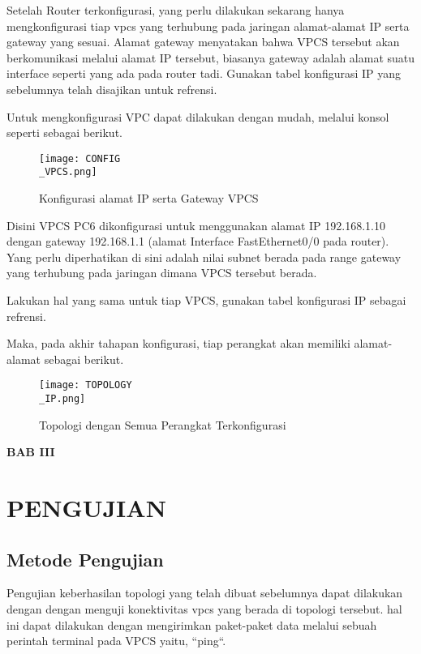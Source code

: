 \documentclass[12pt, a4paper]{article}
\begin{document}
  Setelah Router terkonfigurasi, yang perlu dilakukan sekarang hanya 
  mengkonfigurasi tiap vpcs yang terhubung pada jaringan alamat-alamat IP serta
  gateway yang sesuai. Alamat gateway menyatakan bahwa VPCS tersebut akan
  berkomunikasi melalui alamat IP tersebut, biasanya gateway adalah alamat
  suatu interface seperti yang ada pada router tadi. Gunakan tabel konfigurasi IP
  yang sebelumnya telah disajikan untuk refrensi.

  Untuk mengkonfigurasi VPC dapat dilakukan dengan mudah, melalui
  konsol seperti sebagai berikut.
  
  \begin{figure}[h]
      \centering
      \texttt{[image: CONFIG\\\_VPCS.png]}
      \caption{\small{Konfigurasi alamat IP serta Gateway VPCS}}
  \end{figure}

  Disini VPCS PC6 dikonfigurasi untuk menggunakan alamat IP 192.168.1.10 dengan
  gateway 192.168.1.1 (alamat Interface FastEthernet0/0 pada router). Yang 
  perlu diperhatikan di sini adalah nilai subnet berada pada range gateway yang
  terhubung pada jaringan dimana VPCS tersebut berada.

  Lakukan hal yang sama untuk tiap VPCS, gunakan tabel konfigurasi IP sebagai
  refrensi.

  \newpage

  Maka, pada akhir tahapan konfigurasi, tiap perangkat akan memiliki alamat-alamat
  sebagai berikut.

  \begin{figure}[h]
      \centering
      \texttt{[image: TOPOLOGY\\\_IP.png]}
      \caption{\small{Topologi dengan Semua Perangkat Terkonfigurasi}}
  \end{figure}

  \newpage


  \begin{center}
    \large{\textbf{BAB III}}
    \section*{PENGUJIAN}
  \end{center}
  \setcounter{section}{3}
  \setcounter{subsection}{0}
  \vspace{1cm}

  \subsection{Metode Pengujian}
  Pengujian keberhasilan topologi yang telah dibuat sebelumnya dapat dilakukan
  dengan dengan menguji konektivitas vpcs yang berada di topologi tersebut. hal
  ini dapat dilakukan dengan mengirimkan paket-paket data melalui sebuah perintah
  terminal pada VPCS yaitu, ``ping``.
\end{document}
